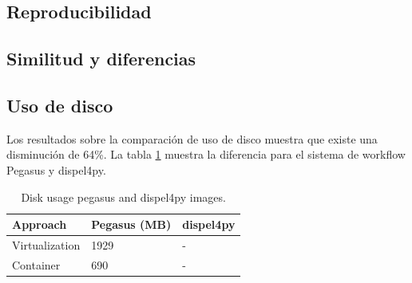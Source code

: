 \subsection{Reproducibilidad}



\subsection{Similitud y diferencias}

\subsection{Uso de disco }

Los resultados sobre la comparación de uso de disco muestra que existe una disminución de 64\%. La tabla \ref{storage-reduce} muestra la diferencia para el sistema de workflow Pegasus y dispel4py.

\begin{table}[]
\begin{tabular}{|l|l|l|}
\hline
Approach       & Pegasus (MB) & dispel4py \\ \hline
Virtualization & 1929         & -  \\ \hline
Container      & 690          &  - \\ \hline
\end{tabular}
\caption{Disk usage pegasus and dispel4py images.}
\label{storage-reduce}
\end{table}



